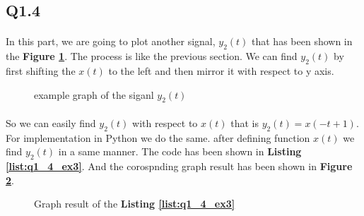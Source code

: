 \subsection{Q1.4}

\paragraph{}In this part, we are going to plot another
signal, $y_2(t)$ that has been shown in the 
\textbf{Figure \ref{fig:ex3}}. The process is like 
the previous section. We can find $y_2(t)$ by first shifting 
the $x(t)$ to the left and then mirror it with respect 
to y axis.

\begin{figure}[H]
 \centering
{}
\caption{example graph of the siganl $y_2(t)$}
  \label{fig:ex3}
\end{figure}
\paragraph{}
So we can easily find $y_2(t)$ with respect to $x(t)$ 
that is $y_2(t) = x(-t+1)$. For implementation 
in Python we do the same. after defining function 
$x(t)$ we find $y_2(t)$ in a same manner. The code 
has been shown in \textbf{Listing \ref{list:q1_4_ex3}}. And the 
corospnding graph result has been shown in 
\textbf{Figure \ref{fig:Q1-4-ex3}}.

\begin{figure}[H]
  \centering
  \scalebox{0.6}{}
  \caption{Graph result of the \textbf{Listing \ref{list:q1_4_ex3}}}
  \label{fig:Q1-4-ex3}
\end{figure}
